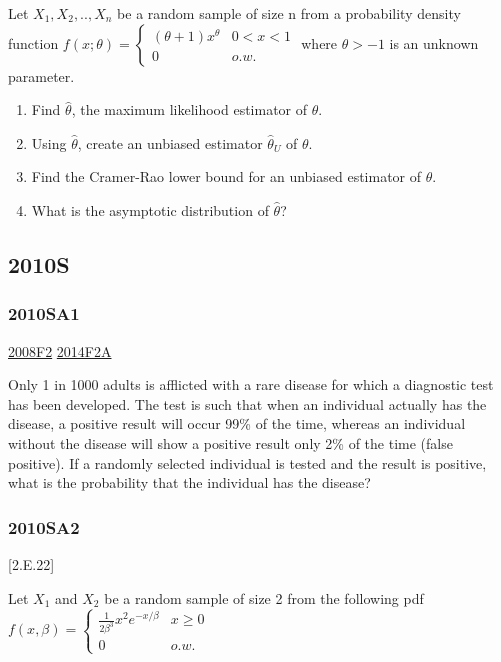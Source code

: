 \documentclass[10pt,twocolumn,portrait]{article}
\begin{document}
Let \(X_1,X_2,..,X_n\) be a random sample of size n from a probability
density function
\(f(x;\theta)=\begin{cases}(\theta+1)x^\theta& 0<x<1\\0& o.w.\end{cases}\)
where \(\theta>-1\) is an unknown parameter.

\begin{enumerate}
\def\labelenumi{(\alph{enumi})}
\item
  Find \(\hat\theta\), the maximum likelihood estimator of \(\theta\).
\item
  Using \(\hat\theta\), create an unbiased estimator \(\hat\theta_U\) of
  \(\theta\).
\item
  Find the Cramer-Rao lower bound for an unbiased estimator of
  \(\theta\).
\item
  What is the asymptotic distribution of \(\hat\theta\)?
\end{enumerate}

\hypertarget{s-4}{%
\subsection{2010S}\label{s-4}}

\hypertarget{sa1-1}{%
\subsubsection{2010SA1}\label{sa1-1}}

\protect\hyperlink{f2-3}{2008F2} \protect\hyperlink{f2a-1}{2014F2A}

Only 1 in 1000 adults is afflicted with a rare disease for which a
diagnostic test has been developed. The test is such that when an
individual actually has the disease, a positive result will occur 99\%
of the time, whereas an individual without the disease will show a
positive result only 2\% of the time (false positive). If a randomly
selected individual is tested and the result is positive, what is the
probability that the individual has the disease?

\hypertarget{sa2-1}{%
\subsubsection{2010SA2}\label{sa2-1}}

{[}2.E.22{]}

Let \(X_1\) and \(X_2\) be a random sample of size 2 from the following
pdf
\(f(x,\beta)=\begin{cases} \frac1{2\beta^3}x^2e^{-x/\beta}& x\ge0\\0& o.w.\end{cases}\)
\end{document}
